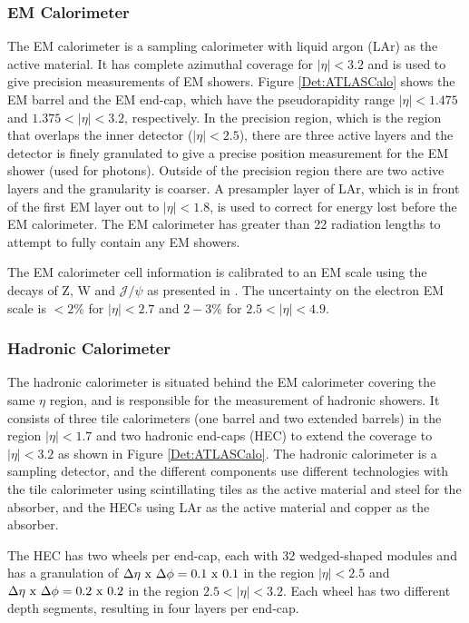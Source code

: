 \subsubsection{EM Calorimeter}

The EM calorimeter is a sampling calorimeter with liquid argon (LAr) as the active material. 
It has complete azimuthal coverage for $|\eta|<3.2$ and is used to give precision measurements of EM showers.
Figure \ref{Det:ATLASCalo} shows the EM barrel and the EM end-cap, which have the pseudorapidity range $|\eta|<1.475$ and $1.375<|\eta|<3.2$, respectively.
In the precision region,  which is the region that overlaps the inner detector ($|\eta|<2.5$), there are three active layers and the detector is finely granulated to give a precise position measurement for the EM shower (used for photons).
Outside of the precision region there are two active layers and the granularity is coarser.
A presampler layer of LAr, which is in front of the first EM layer out to $|\eta|<1.8$, is used to correct for energy lost before the EM calorimeter. 
The EM calorimeter has greater than 22 radiation lengths to attempt to fully contain any EM showers.

The EM calorimeter cell information is calibrated to an EM scale using the decays of Z, W and $\mathcal{J}/\psi$ as presented in \cite{ref:ZeeCalib}. 
The uncertainty on the electron EM scale is $<2\%$ for $|\eta|<2.7$ and $2-3\%$ for $2.5<|\eta|<4.9$. 

\subsubsection{Hadronic Calorimeter}



The hadronic calorimeter is situated behind the EM calorimeter covering the same $\eta$ region, and is responsible for the measurement of hadronic showers. 
It consists of three tile calorimeters (one barrel and two extended barrels) in the region $|\eta|<1.7$ and two hadronic end-caps (HEC) to extend the coverage to $|\eta|<3.2$ as shown in Figure \ref{Det:ATLASCalo}.
The hadronic calorimeter is a sampling detector, and the different components use different technologies with the tile calorimeter using  scintillating tiles as the active material and steel for the absorber, and the HECs using LAr as the active material and copper as the absorber.

The HEC has two wheels per end-cap, each with 32 wedged-shaped modules and has a granulation of $\Delta\eta~\rm{x}~\Delta\phi = 0.1~\rm{x}~0.1$ in the region $|\eta|<2.5$ and $\Delta\eta~\rm{x}~\Delta\phi = 0.2~\rm{x}~0.2$ in the region $2.5<|\eta|<3.2$.
Each wheel has two different depth segments, resulting in four layers per end-cap.

